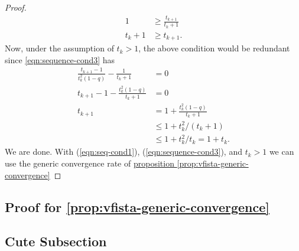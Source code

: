 \begin{proof}
\begin{align*}
            1 &\ge 
            \frac{t_{k + 1}}{t_k + 1}
            \\
            t_k + 1 &\ge t_{k + 1}. 
        \end{align*}
        Now, under the assumption of $t_k > 1$, the above condition would be redundant since \ref*{eqn:sequence-cond3} has 
        \begin{align*}
            \frac{t_{k + 1} - 1}{t_k^2(1 - q)}
            -
            \frac{1}{t_k + 1} &= 0
            \\
            t_{k + 1} - 1 - 
            \frac{t_k^2(1 - q)}{t_k + 1} &= 0
            \\
            t_{k + 1} &= 1 + 
            \frac{t_k^2(1 - q)}{t_k + 1}
            \\
            & \le 1 + t_k^2/(t_k + 1)
            \\
            &\le 1 + t_k^2/t_k = 1 + t_k. 
        \end{align*}
        We are done. 
        With (\ref*{eqn:seq-cond1}), (\ref*{eqn:sequence-cond3}), and $t_k > 1$ we can use the generic convergence rate of \hyperref[prop:vfista-generic-convergence]{proposition \ref*{prop:vfista-generic-convergence}}
    \end{proof}

\subsection{Proof for \ref*{prop:vfista-generic-convergence}}

\subsection{Cute Subsection}

